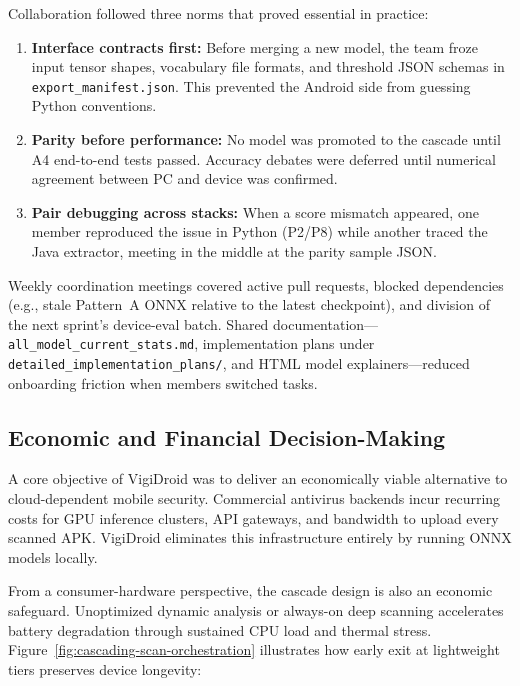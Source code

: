 Collaboration followed three norms that proved essential in practice:
\begin{enumerate}
 \item \textbf{Interface contracts first:} Before merging a new model, the team froze input tensor shapes, vocabulary file formats, and threshold JSON schemas in \texttt{export\_manifest.json}. This prevented the Android side from guessing Python conventions.
 \item \textbf{Parity before performance:} No model was promoted to the cascade until A4 end-to-end tests passed. Accuracy debates were deferred until numerical agreement between PC and device was confirmed.
 \item \textbf{Pair debugging across stacks:} When a score mismatch appeared, one member reproduced the issue in Python (P2/P8) while another traced the Java extractor, meeting in the middle at the parity sample JSON.
\end{enumerate}

Weekly coordination meetings covered active pull requests, blocked dependencies (e.g., stale Pattern~A ONNX relative to the latest checkpoint), and division of the next sprint's device-eval batch. Shared documentation---\texttt{all\_model\_current\_stats.md}, implementation plans under \texttt{detailed\_implementation\_plans/}, and HTML model explainers---reduced onboarding friction when members switched tasks.

\subsection{Economic and Financial Decision-Making}
A core objective of VigiDroid was to deliver an economically viable alternative to cloud-dependent mobile security. Commercial antivirus backends incur recurring costs for GPU inference clusters, API gateways, and bandwidth to upload every scanned APK. VigiDroid eliminates this infrastructure entirely by running ONNX models locally.

From a consumer-hardware perspective, the cascade design is also an economic safeguard. Unoptimized dynamic analysis or always-on deep scanning accelerates battery degradation through sustained CPU load and thermal stress. Figure~\ref{fig:cascading-scan-orchestration} illustrates how early exit at lightweight tiers preserves device longevity:


